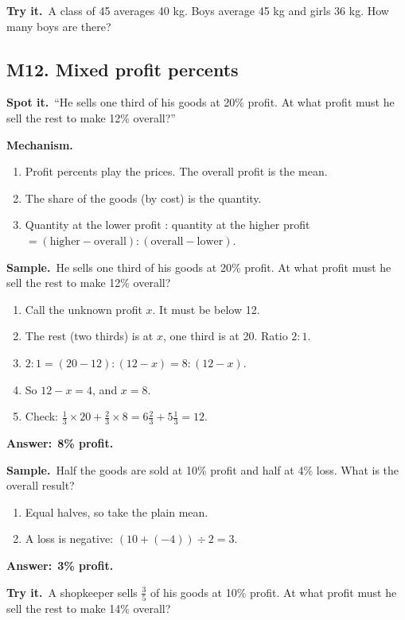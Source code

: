 \documentclass[11pt,a4paper]{article}
\let\oldsubsection\subsection
\renewcommand{\subsection}{\needspace{9\baselineskip}\oldsubsection}
\newcommand{\spot}{\textbf{\color{ember}Spot it.}\ }
\newcommand{\mech}{\textbf{\color{ember}Mechanism.}\ }
\newif\ifkeepsamp
\newcommand{\ans}[1]{\par\nopagebreak\noindent\textbf{\color{ember}Answer:}\ \textbf{#1}\par}
\newcommand{\samp}{\ifkeepsamp\needspace{4\baselineskip}\fi\textbf{\color{ember}Sample.}\ }
\newcommand{\tryit}[1]{\textbf{\color{ember}Try it.}\ #1}
\begin{document}
\tryit A class of 45 averages 40 kg. Boys average 45 kg and girls 36 kg. How many boys are there?

\subsection{M12. Mixed profit percents}
\spot ``He sells one third of his goods at 20\% profit. At what profit must he sell the rest to make 12\% overall?''

\mech
\begin{enumerate}
\item Profit percents play the prices. The overall profit is the mean.
\item The share of the goods (by cost) is the quantity.
\item Quantity at the lower profit : quantity at the higher profit $= (\text{higher} - \text{overall}) : (\text{overall} - \text{lower})$.
\end{enumerate}

\samp He sells one third of his goods at 20\% profit. At what profit must he sell the rest to make 12\% overall?
\begin{enumerate}
\item Call the unknown profit $x$. It must be below 12.
\item The rest (two thirds) is at $x$, one third is at 20. Ratio $2 : 1$.
\item $2 : 1 = (20 - 12) : (12 - x) = 8 : (12 - x)$.
\item So $12 - x = 4$, and $x = 8$.
\item Check: $\tfrac13 \times 20 + \tfrac23 \times 8 = 6\tfrac23 + 5\tfrac13 = 12$.
\end{enumerate}
\ans{8\% profit.}

\samp Half the goods are sold at 10\% profit and half at 4\% loss. What is the overall result?
\begin{enumerate}
\item Equal halves, so take the plain mean.
\item A loss is negative: $(10 + (-4)) \div 2 = 3$.
\end{enumerate}
\ans{3\% profit.}

\tryit A shopkeeper sells $\tfrac35$ of his goods at 10\% profit. At what profit must he sell the rest to make 14\% overall?
\end{document}
